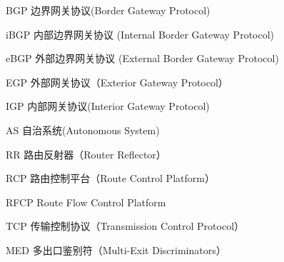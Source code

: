 \begin{denotation}[3cm]
\item[BGP] 边界网关协议(Border Gateway Protocol)
\item[iBGP] 内部边界网关协议 (Internal Border Gateway Protocol)
\item[eBGP] 外部边界网关协议 (External Border Gateway Protocol)
\item[EGP] 外部网关协议（Exterior Gateway Protocol）
\item[IGP] 内部网关协议(Interior Gateway Protocol)
\item[AS] 自治系统(Autonomous System)
\item[RR] 路由反射器（Router Reflector）
\item[RCP] 路由控制平台（Route Control Platform）
\item[RFCP] Route Flow Control Platform
\item[TCP] 传输控制协议（Transmission Control Protocol）
\item[MED] 多出口鉴别符（Multi-Exit Discriminators）
\end{denotation}
